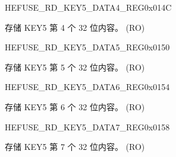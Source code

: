 \begin{register}{H}{EFUSE\_RD\_KEY5\_DATA4\_REG}{0x014C}\label{regdesc:EFUSERDKEY5DATA4REG}
%
\regnewline%
\begin{regdesc}\begin{reglist}
\label{fielddesc:EFUSEKEY5DATA4}\item [EFUSE\_KEY5\_DATA4] 存储 KEY5 第 4 个 32 位内容。 (RO)
\end{reglist}\end{regdesc}
\end{register}


\begin{register}{H}{EFUSE\_RD\_KEY5\_DATA5\_REG}{0x0150}\label{regdesc:EFUSERDKEY5DATA5REG}
%
\regnewline%
\begin{regdesc}\begin{reglist}
\label{fielddesc:EFUSEKEY5DATA5}\item [EFUSE\_KEY5\_DATA5] 存储 KEY5 第 5 个 32 位内容。 (RO)
\end{reglist}\end{regdesc}
\end{register}


\begin{register}{H}{EFUSE\_RD\_KEY5\_DATA6\_REG}{0x0154}\label{regdesc:EFUSERDKEY5DATA6REG}
%
\regnewline%
\begin{regdesc}\begin{reglist}
\label{fielddesc:EFUSEKEY5DATA6}\item [EFUSE\_KEY5\_DATA6] 存储 KEY5 第 6 个 32 位内容。 (RO)
\end{reglist}\end{regdesc}
\end{register}


\begin{register}{H}{EFUSE\_RD\_KEY5\_DATA7\_REG}{0x0158}\label{regdesc:EFUSERDKEY5DATA7REG}
%
\regnewline%
\begin{regdesc}\begin{reglist}
\label{fielddesc:EFUSEKEY5DATA7}\item [EFUSE\_KEY5\_DATA7] 存储 KEY5 第 7 个 32 位内容。 (RO)
\end{reglist}\end{regdesc}
\end{register}


